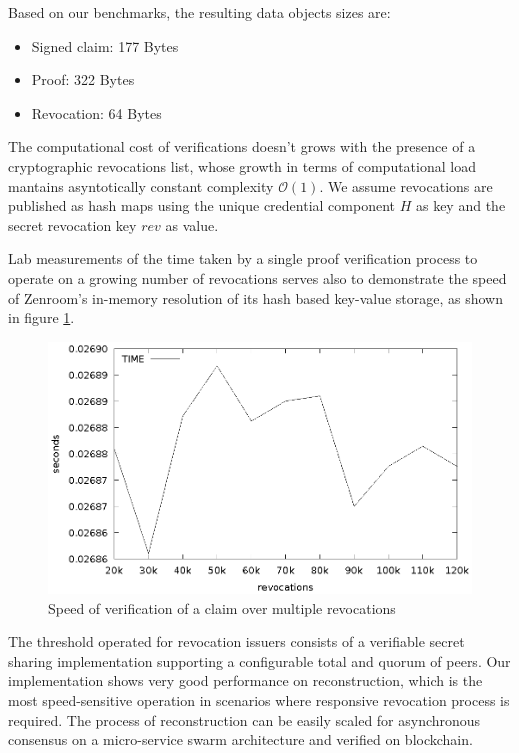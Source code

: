 Based on our benchmarks, the resulting data objects sizes are:
\begin{itemize}
    \item Signed claim: 177 Bytes
    \item Proof:  322 Bytes
    \item Revocation: 64 Bytes
\end{itemize}

The computational cost of verifications doesn't grows with the
presence of a cryptographic revocations list, whose growth in terms of
computational load mantains asyntotically constant complexity
$\mathcal{O}(1)$. We assume revocations are published as hash maps
using the unique credential component $H$ as key and the secret
revocation key $rev$ as value.

Lab measurements of the time taken by a single proof verification
process to operate on a growing number of revocations serves also to
demonstrate the speed of Zenroom's in-memory resolution of its hash
based key-value storage, as shown in figure
\ref{fig:verifyrevocations}.

\begin{figure}
    \centering
    \includegraphics[width=1\linewidth]{verifyrevocations.eps}

    \caption{Speed of verification of a claim over multiple revocations}
    \label{fig:verifyrevocations}
\end{figure}

The threshold operated for revocation issuers consists of a verifiable
secret sharing implementation supporting a configurable total and
quorum of peers. Our implementation shows very good performance on
reconstruction, which is the most speed-sensitive operation in
scenarios where responsive revocation process is required. The process
of reconstruction can be easily scaled for asynchronous consensus on a
micro-service swarm architecture and verified on blockchain.

